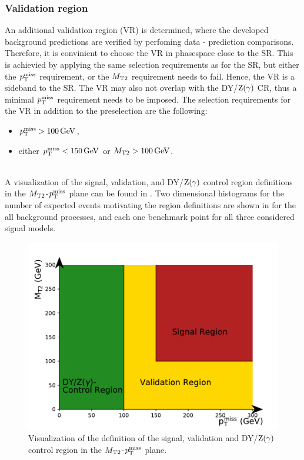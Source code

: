 \subsubsection{Validation region}
An additional validation region (VR) is determined, where the developed background predictions are verified by perfoming data - prediction comparisons. Therefore, it is convinient to choose the VR in phasespace close to the SR. This is achievied by applying the same selection requirements as for the SR, but either the $p_{\mathrm{T}}^\text{miss}$ requirement, or the $M_{\mathrm{T2}}$ requirement needs to fail. Hence, the VR is a sideband to the SR. The VR may also not overlap with the DY/$\mathrm{Z}(\gamma)$ CR, thus a minimal $p_{\mathrm{T}}^\text{miss}$ requirement needs to be imposed. The selection requirements for the VR in addition to the preselection are the following:
\begin{itemize}
 \item $p_{\mathrm{T}}^\text{miss}>100\,\text{Ge\hspace{-.08em}V}$,
 \item either $p_{\mathrm{T}}^\text{miss}<150\,\text{Ge\hspace{-.08em}V}$ or $M_{\mathrm{T2}}>100\,\text{Ge\hspace{-.08em}V}$.
\end{itemize}
\\
A visualization of the signal, validation, and DY/$\mathrm{Z}(\gamma)$ control region definitions in the $M_{\mathrm{T2}}$-$p_{\mathrm{T}}^\text{miss}$ plane can be found in . Two dimensional histograms for the number of expected events motivating the region definitions are shown in  for the all background processes, and each one benchmark point for all three considered signal models.
\begin{figure}[htb]
 \centering
 \includegraphics[width=\pairwidth]{figures/figures/regions}
 \caption{Visualization of the definition of the signal, validation and DY/$\mathrm{Z}(\gamma)$ control region in the $M_{\mathrm{T2}}$-$p_{\mathrm{T}}^\text{miss}$ plane.}
 \label{fig:Regions}
\end{figure}
